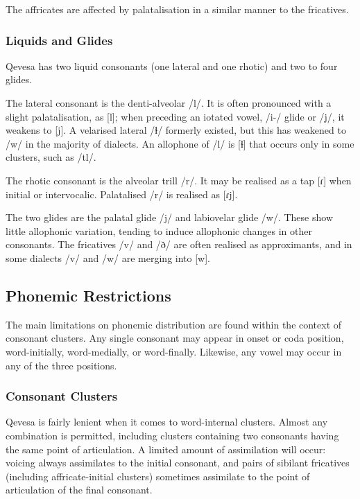 \documentclass[grammar]{subfiles}
\begin{document}
  The affricates are affected by palatalisation in a similar manner to the fricatives.

  \subsubsection{Liquids and Glides}
  \label{sssec:liquids}

  Qevesa has two liquid consonants (one lateral and one rhotic) and two to four glides.

  The lateral consonant is the denti-alveolar /l/.  It is often pronounced with a slight palatalisation, as [l\superj]; when preceding an iotated vowel, /i-/ glide or /j/, it weakens to [j].  A velarised lateral /ɫ/ formerly existed, but this has weakened to /w/ in the majority of dialects.  An allophone of /l/ is [ɬ] that occurs only in some clusters, such as /tl/.

  The rhotic consonant is the alveolar trill /r/.  It may be realised as a tap [ɾ] when initial or intervocalic.  Palatalised /r/ is realised as [ɾj].

  The two glides are the palatal glide /j/ and labiovelar glide /w/.  These show little allophonic variation, tending to induce allophonic changes in other consonants.  The fricatives /v/ and /ð/ are often realised as approximants, and in some dialects /v/ and /w/ are merging into [w].

  \subsection{Phonemic Restrictions}
  \label{ssec:phonemic_restrictions}

  The main limitations on phonemic distribution are found within the context of consonant clusters.  Any single consonant may appear in onset or coda position, word-initially, word-medially, or word-finally.  Likewise, any vowel may occur in any of the three positions. 

  \subsubsection{Consonant Clusters}
  \label{sssec:consonant_clusters}

  Qevesa is fairly lenient when it comes to word-internal clusters. 
  Almost any combination is permitted, including clusters containing two consonants having the same point of articulation. 
  A limited amount of assimilation will occur: voicing always assimilates to the initial consonant, and pairs of sibilant fricatives (including affricate-initial clusters) sometimes assimilate to the point of articulation of the final consonant.  %
\end{document}
